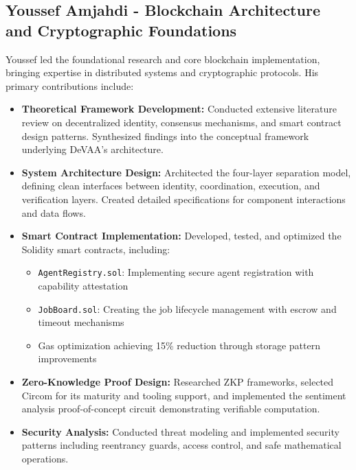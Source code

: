 \subsection{Youssef Amjahdi - Blockchain Architecture and Cryptographic Foundations}

Youssef led the foundational research and core blockchain implementation, bringing expertise in distributed systems and cryptographic protocols. His primary contributions include:

\begin{itemize}
    \item \textbf{Theoretical Framework Development:} Conducted extensive literature review on decentralized identity, consensus mechanisms, and smart contract design patterns. Synthesized findings into the conceptual framework underlying DeVAA's architecture.
    
    \item \textbf{System Architecture Design:} Architected the four-layer separation model, defining clean interfaces between identity, coordination, execution, and verification layers. Created detailed specifications for component interactions and data flows.
    
    \item \textbf{Smart Contract Implementation:} Developed, tested, and optimized the Solidity smart contracts, including:
    \begin{itemize}
        \item \texttt{AgentRegistry.sol}: Implementing secure agent registration with capability attestation
        \item \texttt{JobBoard.sol}: Creating the job lifecycle management with escrow and timeout mechanisms
        \item Gas optimization achieving 15\% reduction through storage pattern improvements
    \end{itemize}
    
    \item \textbf{Zero-Knowledge Proof Design:} Researched ZKP frameworks, selected Circom for its maturity and tooling support, and implemented the sentiment analysis proof-of-concept circuit demonstrating verifiable computation.
    
    \item \textbf{Security Analysis:} Conducted threat modeling and implemented security patterns including reentrancy guards, access control, and safe mathematical operations.
\end{itemize}

